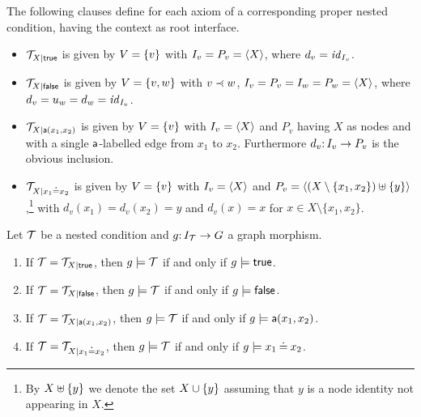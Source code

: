 \begin{definition}
\label{def:atomic formulas}
The following clauses define for each axiom of  a corresponding proper nested condition, having the context as root interface. 
\begin{itemize}
\item ${\mathcal{T}}_{{X} \mid {\mathsf{true}}}$ is given by $V=\{{v}\}$ with $I_v=P_v=\langle X\rangle$, where $d_v={\mathit{id}}_{I_v}$. %
\item ${\mathcal{T}}_{{X} \mid {\mathsf{false}}}$ is given by $V=\{{v,w}\}$ with $v\parentof w$, $I_v=P_v=I_w=P_w=\langle X\rangle$, where $d_v=u_w=d_w={\mathit{id}}_{I_v}$. %
\item ${\mathcal{T}}_{{X} \mid {\mathsf{a}(x_1,x_2)}}$ is given by $V=\{{v}\}$ with $I_v= \langle X\rangle$ and $P_v$ having $X$ as nodes and with a single $\mathsf{a}$-labelled edge from $x_1$ to $x_2$. Furthermore %
$d_v{:}\, I_v\rightarrow P_v$ is the obvious inclusion.
\item ${\mathcal{T}}_{{X} \mid {x_1\mathbin{\doteq}x_2}}$ is given by $V=\{{v}\}$ with $I_v=\langle X\rangle$ and $P_v=\langle (X \setminus \{x_1,x_2\}) \uplus \{{y}\}\rangle$,\footnote{By $X\uplus \{{y}\}$ we denote the set $X \cup \{{y}\}$ assuming that $y$ is a node identity not appearing in $X$.} 
with 
$d_v(x_1) = d_v(x_2) = y$ and $d_v(x) = x$ for $x \in X\setminus \{x_1,x_2\}$.
\end{itemize}
\end{definition}

\begin{proposition}
	\label{pr:atomic satisfaction}
Let ${\mathcal{T}}$ be a {\proper} nested condition and $g{:}\, I_{\mathcal{T}}\rightarrow G$ a graph morphism.
\begin{enumerate}
\item If ${\mathcal{T}}={\mathcal{T}}_{{X} \mid {\mathsf{true}}}$, then $g\models {\mathcal{T}}$ if and only if $g\models\mathsf{true}$.
\item If ${\mathcal{T}}={\mathcal{T}}_{{X} \mid {\mathsf{false}}}$, then $g\models {\mathcal{T}}$ if and only if $g\models\mathsf{false}$.
\item If ${\mathcal{T}}={\mathcal{T}}_{{X} \mid {\mathsf{a}(x_1,x_2)}}$, then $g\models {\mathcal{T}}$ if and only if $g\models\mathsf{a}(x_1,x_2)$.
\item If ${\mathcal{T}}={\mathcal{T}}_{{X} \mid {x_1 \mathbin{\doteq}x_2}}$, then $g\models {\mathcal{T}}$ if and only if $g\models x_1\mathbin{\doteq} x_2$.
\end{enumerate}
\end{proposition}

